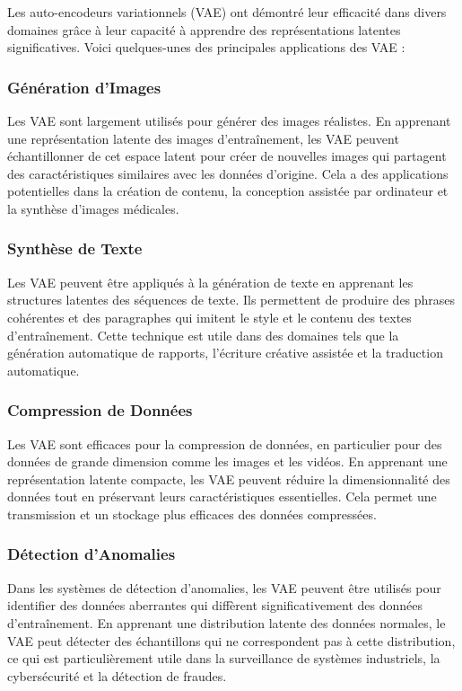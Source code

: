 Les auto-encodeurs variationnels (VAE) ont démontré leur efficacité dans divers
domaines grâce à leur capacité à apprendre des représentations latentes
significatives. Voici quelques-unes des principales applications des VAE :

\subsubsection{Génération d'Images}

Les VAE sont largement utilisés pour générer des images réalistes. En apprenant
une représentation latente des images d'entraînement, les VAE peuvent
échantillonner de cet espace latent pour créer de nouvelles images qui
partagent des caractéristiques similaires avec les données d'origine. Cela a
des applications potentielles dans la création de contenu, la conception
assistée par ordinateur et la synthèse d'images médicales.

\subsubsection{Synthèse de Texte}

Les VAE peuvent être appliqués à la génération de texte en apprenant les
structures latentes des séquences de texte. Ils permettent de produire des
phrases cohérentes et des paragraphes qui imitent le style et le contenu des
textes d'entraînement. Cette technique est utile dans des domaines tels que la
génération automatique de rapports, l'écriture créative assistée et la
traduction automatique.

\subsubsection{Compression de Données}

Les VAE sont efficaces pour la compression de données, en particulier pour des
données de grande dimension comme les images et les vidéos. En apprenant une
représentation latente compacte, les VAE peuvent réduire la dimensionnalité des
données tout en préservant leurs caractéristiques essentielles. Cela permet une
transmission et un stockage plus efficaces des données compressées.

\subsubsection{Détection d'Anomalies}

Dans les systèmes de détection d'anomalies, les VAE peuvent être utilisés pour
identifier des données aberrantes qui diffèrent significativement des données
d'entraînement. En apprenant une distribution latente des données normales, le
VAE peut détecter des échantillons qui ne correspondent pas à cette
distribution, ce qui est particulièrement utile dans la surveillance de
systèmes industriels, la cybersécurité et la détection de fraudes.

